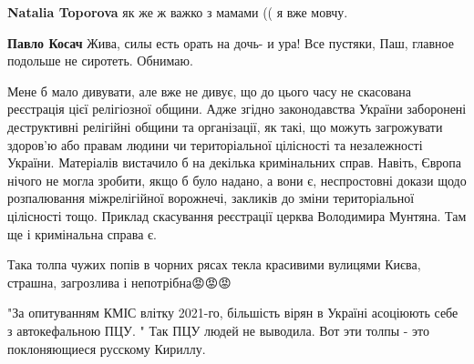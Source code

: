 \begin{itemize}
\begin{itemize}
\textbf{Natalia Toporova} як же ж важко з мамами (( я вже мовчу.

 
\textbf{Павло Косач} Жива, силы есть орать на дочь- и ура! Все пустяки, Паш, главное подольше не сиротеть. Обнимаю.
\end{itemize}

 

Мене б мало дивувати, але вже не дивує, що до цього часу не скасована реєстрація
цієї релігіозної общини. Адже згідно законодавства України заборонені
деструктивні релігійні общини та організації, як такі, що можуть загрожувати
здоров'ю або правам людини чи територіальної цілісності та незалежності
України. Матеріалів вистачило б на декілька кримінальних справ. Навіть, Європа
нічого не могла зробити, якщо б було надано, а вони є, неспростовні докази щодо
розпалювання міжрелігійної ворожнечі, закликів до зміни територіальної
цілісності тощо. Приклад скасування реєстрації церква Володимира Мунтяна. Там
ще і кримінальна справа є.


 

Така толпа чужих попів в чорних рясах текла красивими вулицями
Києва, страшна, загрозлива і непотрібна😡😡😡


 

"За опитуванням КМІС влітку 2021-го, більшість вірян в Україні асоціюють себе з
автокефальною ПЦУ. " Так ПЦУ людей не выводила. Вот эти толпы - это
поклоняющиеся русскому Кириллу.

\begin{itemize}
 

\end{itemize}
\end{itemize}
